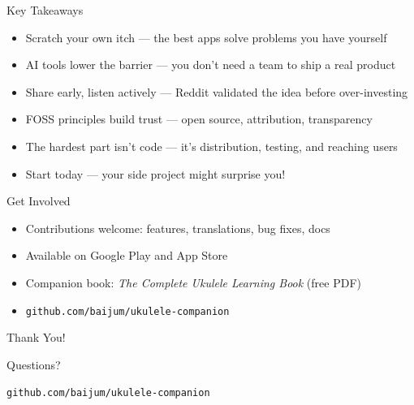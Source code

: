 \documentclass[aspectratio=169]{beamer}
\begin{document}
\begin{frame}{Key Takeaways}
  \begin{itemize}
    \item Scratch your own itch --- the best apps solve problems you have yourself
    \item AI tools lower the barrier --- you don't need a team to ship a real product
    \item Share early, listen actively --- Reddit validated the idea before over-investing
    \item FOSS principles build trust --- open source, attribution, transparency
    \item The hardest part isn't code --- it's distribution, testing, and reaching users
    \item Start today --- your side project might surprise you!
  \end{itemize}
\end{frame}

\begin{frame}{Get Involved}
  \begin{itemize}
    \item Contributions welcome: features, translations, bug fixes, docs
    \item Available on Google Play and App Store
    \item Companion book: \textit{The Complete Ukulele Learning Book} (free PDF)
    \item \texttt{github.com/baijum/ukulele-companion}
  \end{itemize}
\end{frame}

\begin{frame}{Thank You!}
  \begin{center}
    {\Large Questions?}

    \vspace{1cm}

    \texttt{github.com/baijum/ukulele-companion}
  \end{center}
\end{frame}
\end{document}

